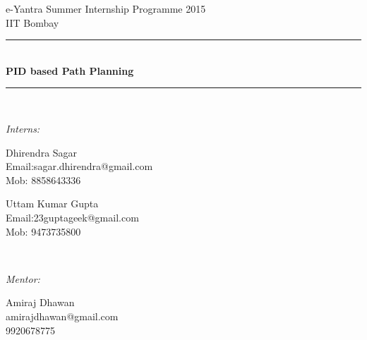 \documentclass[report]{res}
\begin{document}
	
	\begin{titlepage}
		
		\newcommand{\HRule}{\rule{\linewidth}{0.5mm}} %
		
		\center %
		
		{\LARGE e-Yantra Summer Internship Programme 2015}\\[1.5cm] %
		{\Large IIT Bombay}\\[1cm] %
		
		
		
		\HRule \\[0.4cm]
		{ \huge \bfseries PID based Path Planning }\\[0.4cm] %
		\HRule \\[4cm]
		
		
		\begin{minipage}{0.4\textwidth}
			\begin{flushleft} \large
				\emph{Interns: }\\
			\end{flushleft}
			
			\begin{flushleft}
				{\large Dhirendra Sagar} \\  Email:sagar.dhirendra@gmail.com \\ Mob: 8858643336
			\end{flushleft}
			
			\begin{flushleft}
				{\large Uttam Kumar Gupta} \\  Email:23guptageek@gmail.com	\\Mob: 9473735800 \\
			\end{flushleft}
		\end{minipage}
		~
		\begin{minipage}{0.4\textwidth}
			\begin{flushright} \large
				\emph{Mentor:} \\
			\end{flushright}
			\begin{flushright}
				{\large Amiraj Dhawan} \\ amirajdhawan@gmail.com \\ 9920678775
			\end{flushright}
		\end{minipage}\\[2cm]
		

\end{titlepage}
\end{document}
